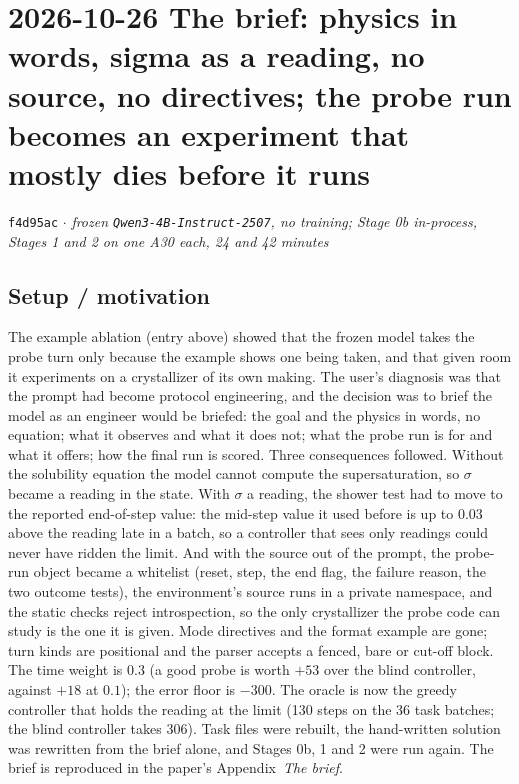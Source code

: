 \documentclass[11pt,a4paper]{article}
\newcommand{\commit}[1]{\texttt{\textcolor{commitgray}{#1}}}
\begin{document}
\section*{2026-10-26 \quad The brief: physics in words, sigma as a reading, no
source, no directives; the probe run becomes an experiment that mostly dies
before it runs}

\commit{f4d95ac} $\cdot$ \textit{frozen \texttt{Qwen3-4B-Instruct-2507}, no
training; Stage 0b in-process, Stages 1 and 2 on one A30 each, 24 and 42
minutes}

\subsection*{Setup / motivation}

The example ablation (entry above) showed that the frozen model takes the
probe turn only because the example shows one being taken, and that given
room it experiments on a crystallizer of its own making. The user's
diagnosis was that the prompt had become protocol engineering, and the
decision was to brief the model as an engineer would be briefed: the goal
and the physics in words, no equation; what it observes and what it does
not; what the probe run is for and what it offers; how the final run is
scored. Three consequences followed. Without the solubility equation the
model cannot compute the supersaturation, so $\sigma$ became a reading in
the state. With $\sigma$ a reading, the shower test had to move to the
reported end-of-step value: the mid-step value it used before is up to
$0.03$ above the reading late in a batch, so a controller that sees only
readings could never have ridden the limit. And with the source out of the
prompt, the probe-run object became a whitelist (reset, step, the end flag,
the failure reason, the two outcome tests), the environment's source runs in
a private namespace, and the static checks reject introspection, so the
only crystallizer the probe code can study is the one it is given. Mode
directives and the format example are gone; turn kinds are positional and
the parser accepts a fenced, bare or cut-off block. The time weight is
$0.3$ (a good probe is worth $+53$ over the blind controller, against $+18$
at $0.1$); the error floor is $-300$. The oracle is now the greedy
controller that holds the reading at the limit (130 steps on the 36 task
batches; the blind controller takes 306). Task files were rebuilt, the
hand-written solution was rewritten from the brief alone, and Stages 0b, 1
and 2 were run again. The brief is reproduced in the paper's
Appendix~\emph{The brief}.
\end{document}
